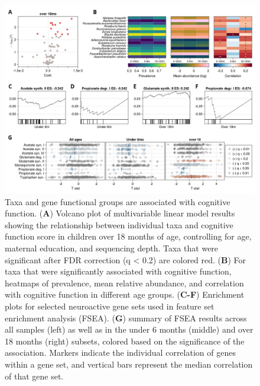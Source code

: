 \documentclass{article}
\begin{document}
\begin{figure}
    \centering
    \includegraphics[width=\textwidth]{assets/Figure2.png}
    \caption{
        Taxa and gene functional groups are associated with cognitive function.
        (\textbf{A}) Volcano plot of multivariable linear model results showing the
        relationship between individual taxa and cognitive function score in
        children over 18 months of age, controlling for age, maternal education,
        and sequencing depth. Taxa that were significant after FDR correction (q
        \textless{} 0.2) are colored red. (\textbf{B}) For taxa that were significantly
        associated with cognitive function, heatmaps of prevalence, mean
        relative abundance, and correlation with cognitive function in different
        age groups. (\textbf{C-F}) Enrichment plots for selected neuroactive gene sets
        used in feature set enrichment analysis (FSEA). (\textbf{G}) summary of FSEA
        results across all samples (left) as well as in the under 6 months
        (middle) and over 18 months (right) subsets, colored based on the
        significance of the association. Markers indicate the individual
        correlation of genes within a gene set, and vertical bars represent the
        median correlation of that gene set.
    }
    \label{fig:2}
\end{figure}
\end{document}
